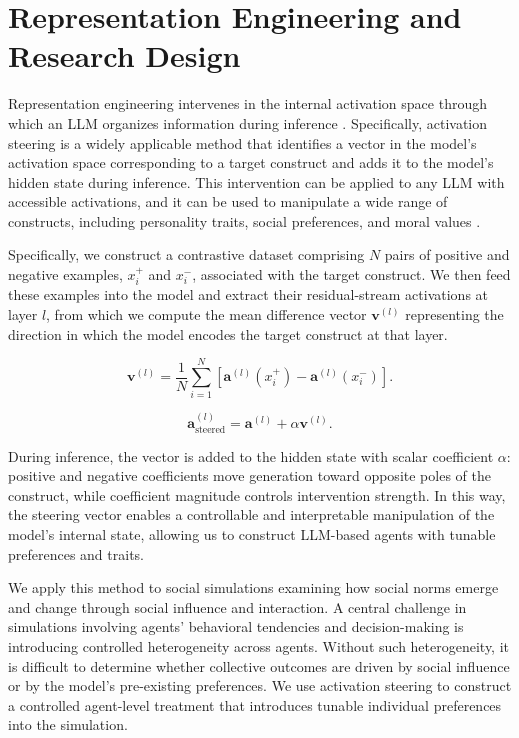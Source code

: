 \documentclass[onecolumn]{main}
\begin{document}
\section{Representation Engineering and Research Design}

Representation engineering intervenes in the internal activation space through which an LLM organizes information during inference \citep{turner2023}. Specifically, activation steering is a widely applicable method that identifies a vector in the model's activation space corresponding to a target construct and adds it to the model's hidden state during inference. This intervention can be applied to any LLM with accessible activations, and it can be used to manipulate a wide range of constructs, including personality traits, social preferences, and moral values \citep{liu2026cobra}.

Specifically, we construct a contrastive dataset comprising $N$ pairs of positive and negative examples, $x_i^{+}$ and $x_i^{-}$, associated with the target construct. We then feed these examples into the model and extract their residual-stream activations at layer $l$, from which we compute the mean difference vector $\mathbf{v}^{(l)}$ representing the direction in which the model encodes the target construct at that layer.

\begin{equation}
  \mathbf{v}^{(l)} = \frac{1}{N}\sum_{i=1}^{N}
  \left[\mathbf{a}^{(l)}(x_i^{+})-\mathbf{a}^{(l)}(x_i^{-})\right].
\end{equation}

\begin{equation}
  \mathbf{a}^{(l)}_{\mathrm{steered}}
  = \mathbf{a}^{(l)} + \alpha\mathbf{v}^{(l)}.
\end{equation}

During inference, the vector is added to the hidden state with scalar coefficient $\alpha$:
positive and negative coefficients move generation toward opposite poles of the construct, while coefficient magnitude controls intervention strength. In this way, the steering vector enables a controllable and interpretable manipulation of the model's internal state, allowing us to construct LLM-based agents with tunable preferences and traits.

We apply this method to social simulations examining how social norms emerge and change through social influence and interaction. A central challenge in simulations involving agents’ behavioral tendencies and decision-making is introducing controlled heterogeneity across agents. Without such heterogeneity, it is difficult to determine whether collective outcomes are driven by social influence or by the model’s pre-existing preferences. We use activation steering to construct a controlled agent-level treatment that introduces tunable individual preferences into the simulation.
\end{document}
